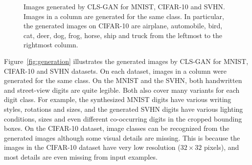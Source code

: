 \begin{figure}[t]
{\begin{minipage}{0.28\linewidth}
\begin{center}
\end{center}
\end{minipage}}\hspace{4mm}
   \caption{Images generated by CLS-GAN for MNIST, CIFAR-10 and SVHN. Images in a column are generated for the same class. In particular, the generated images on CIFAR-10 are airplane, automobile, bird, cat, deer, dog, frog, horse, ship and truck from the leftmost to the rightmost column.}\label{fig:generation}
\label{Fig:dRNN}
\end{figure}

Figure~\ref{fig:generation} illustrates the generated images by CLS-GAN for MNIST, CIFAR-10 and SVHN datasets. On each dataset, images in a column were generated for the same class. On the MNIST and the SVHN, both handwritten and street-view digits are quite legible. Both also cover many variants for each digit class. For example, the synthesized MNIST digits have various writing styles, rotations and sizes, and the generated SVHN digits have various lighting conditions, sizes and even different co-occurring digits in the cropped bounding boxes.  On the CIFAR-10 dataset, image classes can be recognized from the generated images although some visual details are missing. This is because the images in the CIFAR-10 dataset have very low resolution ($32\times 32$ pixels), and most details are even missing from input examples.

